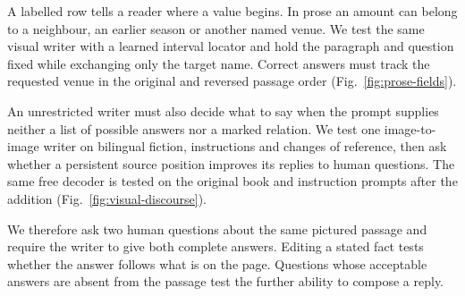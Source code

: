 A labelled row tells a reader where a value begins. In prose an amount can belong to a neighbour, an earlier season or another named venue. We test the same visual writer with a learned interval locator and hold the paragraph and question fixed while exchanging only the target name. Correct answers must track the requested venue in the original and reversed passage order (Fig.~\ref{fig:prose-fields}).

An unrestricted writer must also decide what to say when the prompt supplies neither a list of possible answers nor a marked relation. We test one image-to-image writer on bilingual fiction, instructions and changes of reference, then ask whether a persistent source position improves its replies to human questions. The same free decoder is tested on the original book and instruction prompts after the addition (Fig.~\ref{fig:visual-discourse}).

We therefore ask two human questions about the same pictured passage and require the writer to give both complete answers. Editing a stated fact tests whether the answer follows what is on the page. Questions whose acceptable answers are absent from the passage test the further ability to compose a reply.

